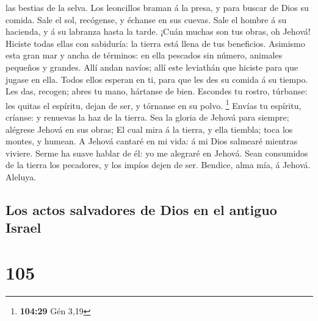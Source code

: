 las bestias de la selva.  Los leoncillos braman á la presa,
y para buscar de Dios su comida.  Sale el sol, recógense, y
échanse en sus cuevas.  Sale el hombre á su hacienda, y á
su labranza hasta la tarde.  ¡Cuán muchas son tus obras, oh
Jehová! Hiciste todas ellas con sabiduría: la tierra está llena de tus
beneficios.  Asimismo esta gran mar y ancha de términos: en
ella pescados sin número, animales pequeños y grandes. 
Allí andan navíos; allí este leviathán que hiciste para que jugase en
ella.  Todos ellos esperan en ti, para que les des su
comida á su tiempo.  Les das, recogen; abres tu mano,
hártanse de bien.  Escondes tu rostro, túrbanse: les quitas
el espíritu, dejan de ser, y tórnanse en su polvo. \footnote{\textbf{104:29}
  Gén 3,19}  Envías tu espíritu, críanse: y renuevas la haz
de la tierra.  Sea la gloria de Jehová para siempre;
alégrese Jehová en sus obras;  El cual mira á la tierra, y
ella tiembla; toca los montes, y humean.  A Jehová cantaré
en mi vida: á mi Dios salmearé mientras viviere.  Serme ha
suave hablar de él: yo me alegraré en Jehová.  Sean
consumidos de la tierra los pecadores, y los impíos dejen de ser.
Bendice, alma mía, á Jehová. Aleluya.

\hypertarget{los-actos-salvadores-de-dios-en-el-antiguo-israel}{%
\subsection{Los actos salvadores de Dios en el antiguo
Israel}\label{los-actos-salvadores-de-dios-en-el-antiguo-israel}}

\hypertarget{section-104}{%
\section{105}\label{section-104}}


